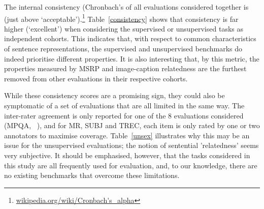 \documentclass[11pt,letterpaper]{article}
\begin{document}
\vspace{5pt} The internal consistency (Chronbach's  of all evaluations considered together is  (just above `acceptable').\footnote{\scriptsize \url{wikipedia.org/wiki/Cronbach's_alpha}} Table~\ref{consistency} shows that consistency is far higher (`excellent') when considering the supervised or unsupervised tasks as independent cohorts. This indicates that, with respect to common characteristics of sentence representations, the supervised and unsupervised benchmarks do indeed prioritise different properties. It is also interesting that, by this metric, the properties measured by MSRP and image-caption relatedness are the furthest removed from other evaluations in their respective cohorts.

While these consistency scores are a promising sign, they could also be symptomatic of a set of evaluations that are all limited in the same way. The inter-rater agreement is only reported for one of the 8 evaluations considered (MPQA, ~\cite{wiebe2005annotating}), and for MR, SUBJ and TREC, each item is only rated by one or two annotators to maximise coverage. Table~\ref{unsex} illustrates why this may be an issue for the unsupervised evaluations; the notion of sentential 'relatedness' seems very subjective. It should be emphasised, however, that the tasks considered in this study are all frequently used for evaluation, and, to our knowledge, there are no existing benchmarks that overcome these limitations. 
\end{document}
